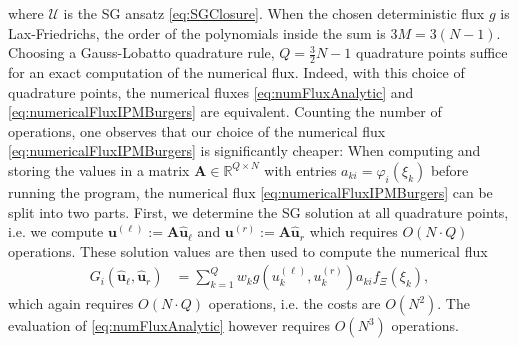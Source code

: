 where $\mathcal{U}$ is the SG ansatz \eqref{eq:SGClosure}. When the chosen deterministic flux $g$ is Lax-Friedrichs, the order of the polynomials inside the sum is $3M=3(N-1)$. Choosing a Gauss-Lobatto quadrature rule, $Q = \frac32 N -1$ quadrature points suffice for an exact computation of the numerical flux. Indeed, with this choice of quadrature points, the numerical fluxes \eqref{eq:numFluxAnalytic} and \eqref{eq:numericalFluxIPMBurgers} are equivalent. 
Counting the number of operations, one observes that our choice of the numerical flux \eqref{eq:numericalFluxIPMBurgers} is significantly cheaper: When computing and storing the values in a matrix $\bm A\in\mathbb{R}^{Q\times N}$ with entries $a_{ki} = \varphi_i(\xi_k)$ before running the program, the numerical flux \eqref{eq:numericalFluxIPMBurgers} can be split into two parts. First, we determine the SG solution at all quadrature points, i.e. we compute $\bm{u}^{(\ell)} := \bm A \bm{\hat u}_{\ell}$ and $\bm{u}^{(r)} := \bm A \bm{\hat u}_{r}$ which requires $O(N\cdot Q)$ operations. These solution values are then used to compute the numerical flux
\begin{align*}
G_i(\bm{\hat u}_{\ell},\bm{\hat u}_{r}) &= \sum_{k=1}^Q w_k g(u^{(\ell)}_k,u^{(r)}_k)a_{ki}f_{\Xi}(\xi_k),
\end{align*}
which again requires $O(N\cdot Q)$ operations, i.e. the costs are $O(N^2)$. The evaluation of \eqref{eq:numFluxAnalytic} however requires $O(N^3)$ operations.